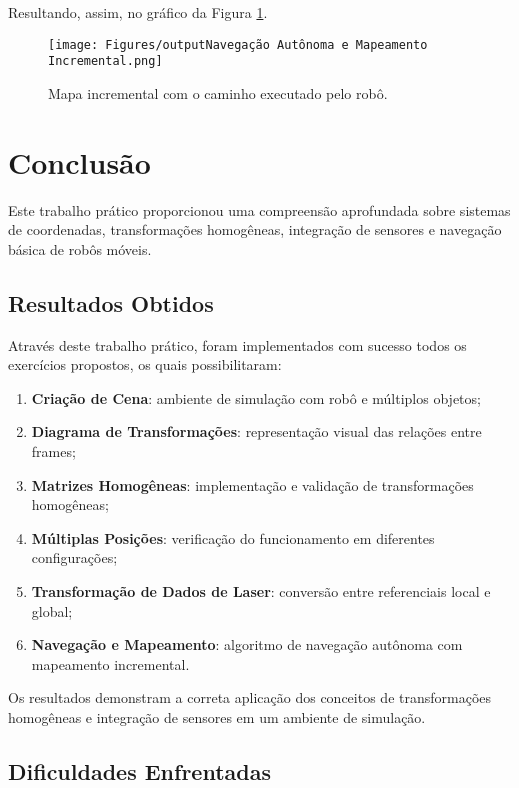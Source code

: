 Resultando, assim, no gráfico da Figura \ref{fig:incre}.

\begin{figure}[H]
\centering
\texttt{[image: Figures/outputNavegação Autônoma e Mapeamento Incremental.png]}
\caption{Mapa incremental com o caminho executado pelo robô.}
\label{fig:incre}
\end{figure}

\chapter{Conclusão} \label{chp:conclusao}

Este trabalho prático proporcionou uma compreensão aprofundada sobre sistemas de coordenadas, transformações homogêneas, integração de sensores e navegação básica de robôs móveis. 

\section{Resultados Obtidos} \label{subsec:resultados}

Através deste trabalho prático, foram implementados com sucesso todos os exercícios propostos, os quais possibilitaram:

\begin{enumerate}
    \item \textbf{Criação de Cena}: ambiente de simulação com robô e múltiplos objetos;
    \item \textbf{Diagrama de Transformações}: representação visual das relações entre frames;
    \item \textbf{Matrizes Homogêneas}: implementação e validação de transformações homogêneas;
    \item \textbf{Múltiplas Posições}: verificação do funcionamento em diferentes configurações;
    \item \textbf{Transformação de Dados de Laser}: conversão entre referenciais local e global;
    \item \textbf{Navegação e Mapeamento}: algoritmo de navegação autônoma com mapeamento incremental.
\end{enumerate}

Os resultados demonstram a correta aplicação dos conceitos de transformações homogêneas e integração de sensores em um ambiente de simulação.

\section{Dificuldades Enfrentadas} \label{subsec:dificuldades}

